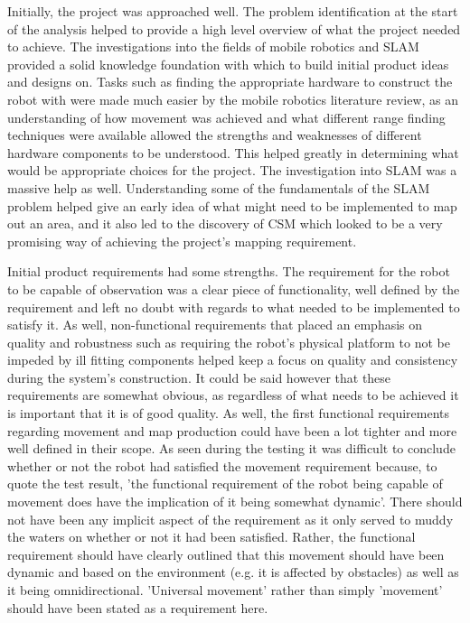 	Initially, the project was approached well. The problem identification at the start of the analysis helped to provide a high level overview of what the project needed to achieve. The investigations into the fields of mobile robotics and SLAM provided a solid knowledge foundation with which to build initial product ideas and designs on. Tasks such as finding the appropriate hardware to construct the robot with were made much easier by the mobile robotics literature review, as an understanding of how movement was achieved and what different range finding techniques were available allowed the strengths and weaknesses of different hardware components to be understood. This helped greatly in determining what would be appropriate choices for the project. The investigation into SLAM was a massive help as well. Understanding some of the fundamentals of the SLAM problem helped give an early idea of what might need to be implemented to map out an area, and it also led to the discovery of CSM which looked to be a very promising way of achieving the project's mapping requirement.
	
	Initial product requirements had some strengths. The requirement for the robot to be capable of observation was a clear piece of functionality, well defined by the requirement and left no doubt with regards to what needed to be implemented to satisfy it. As well, non-functional requirements that placed an emphasis on quality and robustness such as requiring the robot's physical platform to not be impeded by ill fitting components helped keep a focus on quality and consistency during the system's construction. It could be said however that these requirements are somewhat obvious, as regardless of what needs to be achieved it is important that it is of good quality. As well, the first functional requirements regarding movement and map production could have been a lot tighter and more well defined in their scope. As seen during the testing it was difficult to conclude whether or not the robot had satisfied the movement requirement because, to quote the test result, 'the functional requirement of the robot being capable of movement does have the implication of it being somewhat dynamic'. There should not have been any implicit aspect of the requirement as it only served to muddy the waters on whether or not it had been satisfied. Rather, the functional requirement should have clearly outlined that this movement should have been dynamic and based on the environment (e.g. it is affected by obstacles) as well as it being omnidirectional. 'Universal movement' rather than simply 'movement' should have been stated as a requirement here.
	
